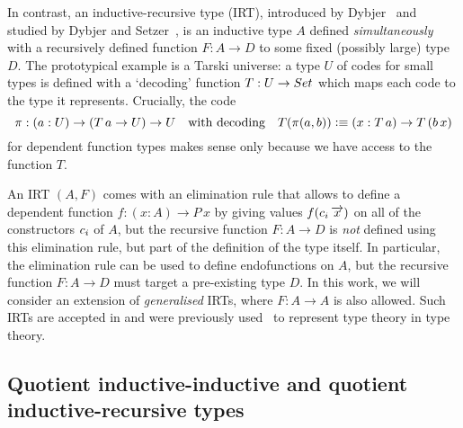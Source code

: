 \documentclass[a4paper,UKenglish,numberwithinsect,cleveref,thm-restate]{lipics-v2021}
\newcommand{\LT}[2][]{\todo[inline,author={L-T},caption={},color={pink},#1]{#2}}
\begin{document}
In contrast, an inductive-recursive type (IRT), introduced by Dybjer~\cite{Dybjer2000} and studied by Dybjer and Setzer~\cite{Dybjer1999,Dybjer2003}, is an inductive type $A$ defined \emph{simultaneously} with a recursively defined function $F : A \to D$ to some fixed (possibly large) type $D$.
The prototypical example is a Tarski universe: a type $U$ of codes for small types is defined with a `decoding' function $T : U \to \Set$ which maps each code to the type it represents. Crucially, the code
\[
  \pi : (a : U) \to (T\,a \to U) \to U
  \quad\text{with decoding}\quad T(\pi(a, b)) \vcentcolon\equiv (x : T\,a) \to T\,(b\, x)
\]
for dependent function types makes sense only because we have access to the function $T$.
%

An IRT $(A, F)$ comes with an elimination rule that allows to define a dependent function  $f : (x : A) \to P\,x$ by giving values $f(\cc_i\,\overrightarrow{x})$ on all of the constructors $\cc_i$ of $A$, but the recursive function $F : A \to D$ is \emph{not} defined using this elimination rule, but part of the definition of the type itself.
%
In particular, the elimination rule can be used to define endofunctions on $A$, but the recursive function  $F : A \to D$ must target a pre-existing type $D$.
%
In this work, we will consider an extension of \emph{generalised} IRTs, where $F : A \to A$ is also allowed.
%
Such IRTs are accepted in \Agda and were previously used~\cite{Danielsson2006} to represent type theory in type theory.
%



\subsection{Quotient inductive-inductive and quotient inductive-recursive types}
\end{document}
